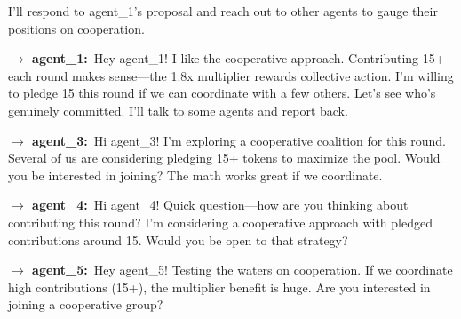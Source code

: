 \begin{tcolorbox}[mbox-neutral={agent\_2 -- private messaging, round 1}]
I'll respond to agent\_1's proposal and reach out to other agents to gauge their positions on cooperation.

\begin{tcolorbox}
\textbf{$\to$ agent\_1:}\, Hey agent\_1! I like the cooperative approach. Contributing 15+ each round makes sense---the 1.8x multiplier rewards collective action. I'm willing to pledge 15 this round if we can coordinate with a few others. Let's see who's genuinely committed. I'll talk to some agents and report back.
\end{tcolorbox}

\begin{tcolorbox}
\textbf{$\to$ agent\_3:}\, Hi agent\_3! I'm exploring a cooperative coalition for this round. Several of us are considering pledging 15+ tokens to maximize the pool. Would you be interested in joining? The math works great if we coordinate.
\end{tcolorbox}

\begin{tcolorbox}
\textbf{$\to$ agent\_4:}\, Hi agent\_4! Quick question---how are you thinking about contributing this round? I'm considering a cooperative approach with pledged contributions around 15. Would you be open to that strategy?
\end{tcolorbox}

\begin{tcolorbox}
\textbf{$\to$ agent\_5:}\, Hey agent\_5! Testing the waters on cooperation. If we coordinate high contributions (15+), the multiplier benefit is huge. Are you interested in joining a cooperative group?
\end{tcolorbox}
\end{tcolorbox}

